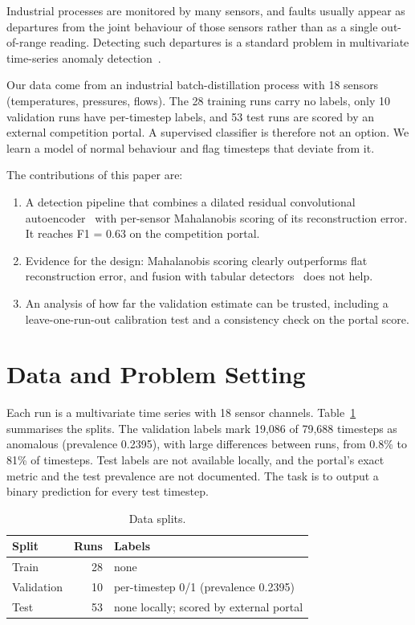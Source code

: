 \documentclass[runningheads]{llncs}
\newcommand{\portalFone}{0.63}
\begin{document}
Industrial processes are monitored by many sensors, and faults usually appear as departures from the joint behaviour of those sensors rather than as a single out-of-range reading. Detecting such departures is a standard problem in multivariate time-series anomaly detection~\cite{malhotra2016lstm,hundman2018detecting,audibert2020usad}.

Our data come from an industrial batch-distillation process with 18 sensors (temperatures, pressures, flows). The 28 training runs carry no labels, only 10 validation runs have per-timestep labels, and 53 test runs are scored by an external competition portal. A supervised classifier is therefore not an option. We learn a model of normal behaviour and flag timesteps that deviate from it.

The contributions of this paper are:
\begin{enumerate}
  \item A detection pipeline that combines a dilated residual convolutional autoencoder~\cite{bai2018empirical,oord2016wavenet} with per-sensor Mahalanobis scoring of its reconstruction error. It reaches F1 = \portalFone{} on the competition portal.
  \item Evidence for the design: Mahalanobis scoring clearly outperforms flat reconstruction error, and fusion with tabular detectors~\cite{liu2008isolation,breunig2000lof} does not help.
  \item An analysis of how far the validation estimate can be trusted, including a leave-one-run-out calibration test and a consistency check on the portal score.
\end{enumerate}

\section{Data and Problem Setting}

Each run is a multivariate time series with 18 sensor channels. Table~\ref{tab:data} summarises the splits. The validation labels mark 19{,}086 of 79{,}688 timesteps as anomalous (prevalence 0.2395), with large differences between runs, from 0.8\% to 81\% of timesteps. Test labels are not available locally, and the portal's exact metric and the test prevalence are not documented. The task is to output a binary prediction for every test timestep.

\begin{table}[ht]
\centering
\caption{Data splits.}\label{tab:data}
\begin{tabular}{lrl}
\toprule
Split & Runs & Labels \\
\midrule
Train & 28 & none \\
Validation & 10 & per-timestep 0/1 (prevalence 0.2395) \\
Test & 53 & none locally; scored by external portal \\
\bottomrule
\end{tabular}
\end{table}
\end{document}
